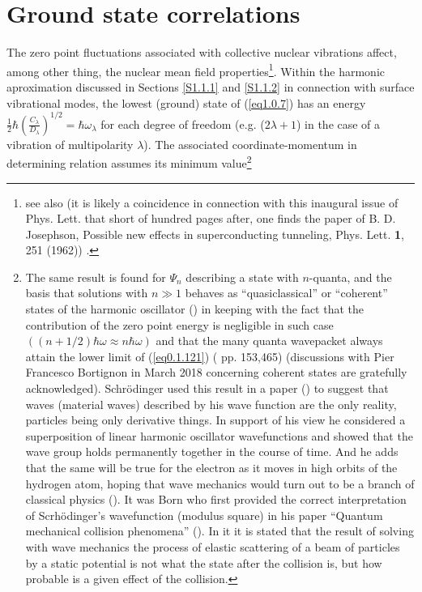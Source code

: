 \section{Ground state correlations}\label{S1.8}
The zero point fluctuations associated with collective nuclear vibrations affect, among other thing, the nuclear mean field properties\footnote{\cite{Gogny:78,Esbensen:83,Reinhard:79,Khodel:82,Barranco:87a} see also \cite{Brown:63,Anderson:62} (it is likely a coincidence in connection with this inaugural issue of Phys. Lett. that short of hundred pages after, one finds the paper of B. D. Josephson, Possible new effects in superconducting tunneling, Phys. Lett. \textbf{1}, 251 (1962)) .}. Within the harmonic aproximation discussed in Sections \ref{S1.1.1} and \ref{S1.1.2} in connection with surface vibrational modes, the lowest (ground) state of (\ref{eq1.0.7}) has an energy $\frac{1}{2}\hbar\left(\frac{C_\lambda}{D_\lambda}\right)^{1/2}=\hbar\omega_\lambda$ for each degree of freedom (e.g. ($2\lambda+1$) in the case of a vibration of multipolarity $\lambda$). The associated coordinate-momentum in determining relation assumes its minimum value\footnote{The same result is found for $\Psi_n$ describing a state with $n$-quanta, and the basis that solutions with $n\gg1$ behaves as ``quasiclassical'' or ``coherent'' states of the harmonic oscillator (\cite{Glauber:07}) in keeping with the fact that the contribution of the zero point energy is negligible in such case $((n+1/2)\hbar\omega\approx n\hbar\omega)$ and that the many quanta wavepacket always attain the lower limit of (\ref{eq0.1.121}) (\cite{Basdevant:05} pp. 153,465) (discussions with Pier Francesco Bortignon in March 2018 concerning coherent states are gratefully acknowledged). Schr\"odinger used this result  in a paper (\cite{Schrodinger:26}) to suggest that waves (material waves) described by his wave function are the only reality, particles being only derivative things. In support of his view he considered a superposition of linear harmonic oscillator wavefunctions and showed that the wave group holds permanently together in the course of time. And he adds that the same will be true for the electron as it moves in high orbits of the hydrogen atom, hoping that wave mechanics would turn out to be a branch of classical physics (\cite{Pais:00}). It was Born who first provided the correct interpretation of Scrh\"odinger's wavefunction (modulus square) in his paper ``Quantum mechanical collision phenomena'' (\cite{Born:26}). In it it is stated that the result of solving with wave mechanics the process of elastic scattering of a beam of particles by a static potential is not what the state after the collision is, but how probable is a given effect of the collision.}

